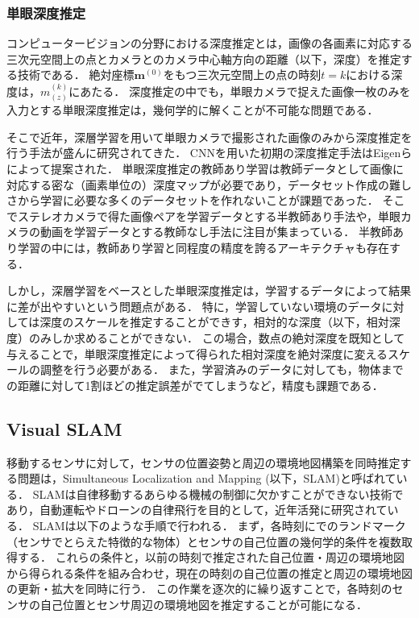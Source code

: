 \subsubsection{単眼深度推定}\label{subsec:depth_estimation}

コンピュータービジョンの分野における深度推定とは，画像の各画素に対応する三次元空間上の点とカメラとのカメラ中心軸方向の距離（以下，深度）を推定する技術である．
絶対座標$\mathbf{m}^{(0)}$をもつ三次元空間上の点の時刻$t=k$における深度は，$m^{(k)}_{(z)}$にあたる．
深度推定の中でも，単眼カメラで捉えた画像一枚のみを入力とする単眼深度推定は，幾何学的に解くことが不可能な問題である．

そこで近年，深層学習を用いて単眼カメラで撮影された画像のみから深度推定を行う手法が盛んに研究されてきた．
CNNを用いた初期の深度推定手法はEigenら\cite{eigen2014depth}によって提案された．
単眼深度推定の教師あり学習は教師データとして画像に対応する密な（画素単位の）深度マップが必要であり，データセット作成の難しさから学習に必要な多くのデータセットを作れないことが課題であった．
そこでステレオカメラで得た画像ペアを学習データとする半教師あり手法\cite{garg2016unsupervised}や，単眼カメラの動画を学習データとする教師なし手法\cite{zhou2017unsupervised}に注目が集まっている．
半教師あり学習の中には，教師あり学習と同程度の精度を誇るアーキテクチャ\cite{Guizilini_2020_CVPR}も存在する．

しかし，深層学習をベースとした単眼深度推定は，学習するデータによって結果に差が出やすいという問題点がある．
特に，学習していない環境のデータに対しては深度のスケールを推定することができす，相対的な深度（以下，相対深度）のみしか求めることができない．
この場合，数点の絶対深度を既知として与えることで，単眼深度推定によって得られた相対深度を絶対深度に変えるスケールの調整を行う必要がある\cite{ranftl2020towards}．
また，学習済みのデータに対しても，物体までの距離に対して1割ほどの推定誤差がでてしまう\cite{fu2018deep}など，精度も課題である．

\subsection{Visual SLAM}\label{subsec:visual_SLAM}

移動するセンサに対して，センサの位置姿勢と周辺の環境地図構築を同時推定する問題は，Simultaneous Localization and Mapping (以下，SLAM)と呼ばれている．
SLAMは自律移動するあらゆる機械の制御に欠かすことができない技術であり，自動運転やドローンの自律飛行を目的として，近年活発に研究されている\cite{tomono正裕2018slam}．
SLAMは以下のような手順で行われる．
まず，各時刻にでのランドマーク（センサでとらえた特徴的な物体）とセンサの自己位置の幾何学的条件を複数取得する．
これらの条件と，以前の時刻で推定された自己位置・周辺の環境地図から得られる条件を組み合わせ，現在の時刻の自己位置の推定と周辺の環境地図の更新・拡大を同時に行う．
この作業を逐次的に繰り返すことで，各時刻のセンサの自己位置とセンサ周辺の環境地図を推定することが可能になる．

